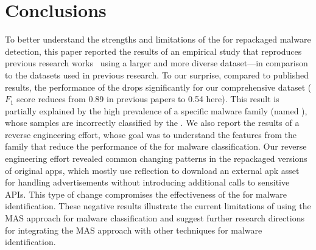 \section{Conclusions}\label{sec:conclusions}


To better understand the strengths and limitations of the \mas for repackaged malware detection, this paper reported the results of an empirical study that reproduces previous research works~\cite{DBLP:conf/wcre/BaoLL18,DBLP:journals/jss/CostaMMSSBNR22} using a larger and more diverse dataset---in comparison to the datasets used in previous research. To our surprise, compared to published results, the performance of the \mas drops significantly for our comprehensive dataset ($F_1$ score reduces from 0.89 in previous papers to 0.54 here). This result is partially explained by the high prevalence of a specific malware family (named \gps), whose samples are incorrectly classified by the \mas. We also report the results of a reverse engineering effort, whose goal was to understand the features from the \gps family that reduce the performance of the \mas for malware classification. Our reverse engineering effort revealed common changing patterns in the \gps repackaged versions of original apps, which mostly use reflection to download an external apk asset for handling advertisements without introducing additional calls to sensitive APIs. This type of change compromises the effectiveness of the \mas for malware identification. These negative results illustrate the current limitations of using the MAS approach for malware classification and suggest further research directions for integrating the MAS approach with other techniques for malware identification.


